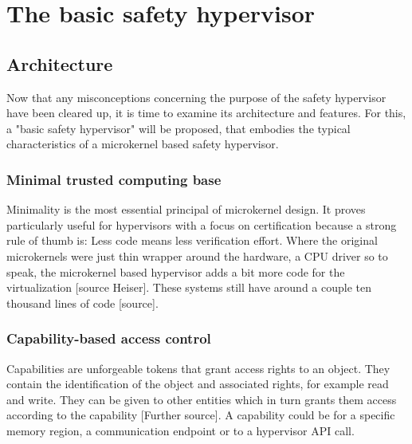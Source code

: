 
\chapter{The basic safety hypervisor} %

\label{Chapter2} %


\newcommand{\keyword}[1]{\textbf{#1}}
\newcommand{\tabhead}[1]{\textbf{#1}}
\newcommand{\code}[1]{\texttt{#1}}
\newcommand{\file}[1]{\texttt{\bfseries#1}}
\newcommand{\option}[1]{\texttt{\itshape#1}}


\section{Architecture}
Now that any misconceptions concerning the purpose of the safety hypervisor have been cleared up, it is time to examine its architecture and features. For this, a "basic safety hypervisor" will be proposed, that embodies the typical characteristics of a microkernel based safety hypervisor.

\subsection{Minimal trusted computing base}
Minimality is the most essential principal of microkernel design. It proves particularly useful for hypervisors with a focus on certification because a strong rule of thumb is: Less code means less verification effort. 
Where the original microkernels were just thin wrapper around the hardware, a \gls{CPU} driver so to speak, the microkernel based hypervisor adds a bit more code for the virtualization [source Heiser]. These systems still have around a couple ten thousand lines of code [source].

\subsection{Capability-based access control}
Capabilities are unforgeable tokens that grant access rights to an object. They contain the identification of the object and associated rights, for example read and write.
They can be given to other entities which in turn grants them access according to the capability [Further source]. A capability could be for a specific memory region, a communication endpoint or to a hypervisor \gls{API} call.

